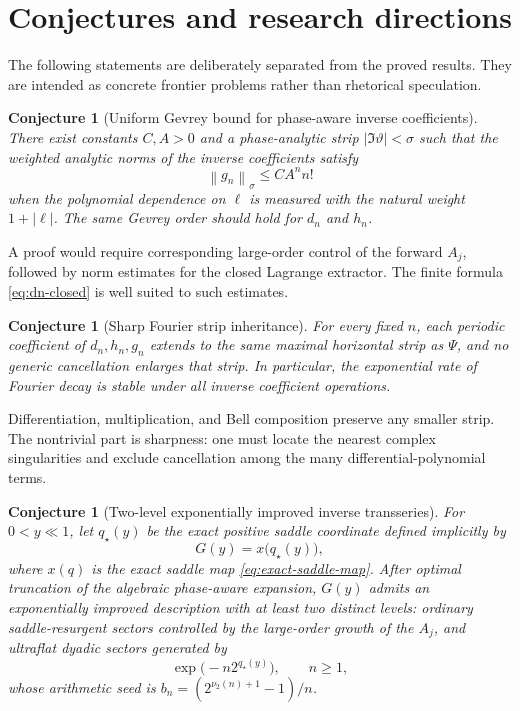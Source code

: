 \documentclass[11pt,oneside]{article}
\numberwithin{equation}{section}
\newtheorem{conjecture}[theorem]{Conjecture}
\theoremstyle{definition}
\theoremstyle{remark}
\newcommand{\abs}[1]{\left|#1\right|}
\newcommand{\norm}[1]{\left\lVert#1\right\rVert}
\newcommand{\vTwo}{\nu_2}
\newcommand{\phase}{\vartheta}
\begin{document}
\section{Conjectures and research directions}
\label{sec:conjectures}

The following statements are deliberately separated from the proved results.
They are intended as concrete frontier problems rather than rhetorical
speculation.

\begin{conjecture}[Uniform Gevrey bound for phase-aware inverse coefficients]
\label{conj:Gevrey}
There exist constants $C,A>0$ and a phase-analytic strip
$\abs{\Im\phase}<\sigma$ such that the weighted analytic norms of the inverse
coefficients satisfy
\begin{equation}
 \norm{g_n}_{\sigma}\le CA^n n!
 \label{eq:Gevrey-bound}
\end{equation}
when the polynomial dependence on $\ell$ is measured with the natural weight
$1+\abs\ell$.  The same Gevrey order should hold for $d_n$ and $h_n$.
\end{conjecture}

A proof would require corresponding large-order control of the forward
$A_j$, followed by norm estimates for the closed Lagrange extractor.  The
finite formula \eqref{eq:dn-closed} is well suited to such estimates.

\begin{conjecture}[Sharp Fourier strip inheritance]
\label{conj:strip}
For every fixed $n$, each periodic coefficient of $d_n,h_n,g_n$ extends to the
same maximal horizontal strip as $\Psi$, and no generic cancellation enlarges
that strip.  In particular, the exponential rate of Fourier decay is stable
under all inverse coefficient operations.
\end{conjecture}

Differentiation, multiplication, and Bell composition preserve any smaller
strip.  The nontrivial part is sharpness: one must locate the nearest complex
singularities and exclude cancellation among the many differential-polynomial
terms.

\begin{conjecture}[Two-level exponentially improved inverse transseries]
\label{conj:hyper}
For $0<y\ll1$, let $q_\star(y)$ be the exact positive saddle coordinate defined
implicitly by
\begin{equation}
 G(y)=x\bigl(q_\star(y)\bigr),
 \label{eq:qstar-def}
\end{equation}
where $x(q)$ is the exact saddle map \eqref{eq:exact-saddle-map}.  After optimal
truncation of the algebraic phase-aware expansion, $G(y)$ admits an
exponentially improved description with at least two distinct levels:
ordinary saddle-resurgent sectors controlled by the large-order growth of the
$A_j$, and ultraflat dyadic sectors generated by
\begin{equation}
 \exp\bigl(-n2^{q_\star(y)}\bigr),
 \qquad n\ge1,
 \label{eq:ultraflat-scales}
\end{equation}
whose arithmetic seed is $b_n=(2^{\vTwo(n)+1}-1)/n$.
\end{conjecture}
\end{document}
